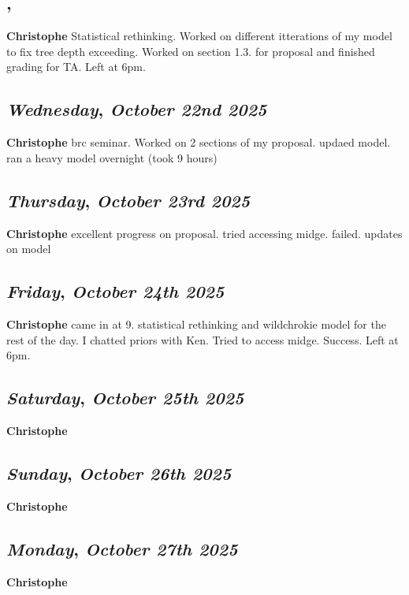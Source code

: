\subsection*{\weekday, \day}
\textbf {Christophe}
Statistical rethinking. Worked on different itterations of my model to fix tree depth exceeding. Worked on section 1.3. for proposal and finished grading for TA. Left at 6pm.

\def\day{\textit{October 22nd 2025}}
\def\weekday{\textit{Wednesday}}
\subsection*{\weekday, \day}
\textbf {Christophe}
brc seminar. Worked on 2 sections of my proposal. updaed model. ran a heavy model overnight (took 9 hours)

\def\day{\textit{October 23rd 2025}}
\def\weekday{\textit{Thursday}}
\subsection*{\weekday, \day}
\textbf {Christophe}
excellent progress on proposal. tried accessing midge. failed. updates on model

\def\day{\textit{October 24th 2025}}
\def\weekday{\textit{Friday}}
\subsection*{\weekday, \day}
\textbf {Christophe}
came in at 9. statistical rethinking and wildchrokie model for the rest of the day. I chatted priors with Ken. Tried to access midge. Success. Left at 6pm. 
\def\day{\textit{October 25th 2025}}
\def\weekday{\textit{Saturday}}
\subsection*{\weekday, \day}
\textbf {Christophe}

\def\day{\textit{October 26th 2025}}
\def\weekday{\textit{Sunday}}
\subsection*{\weekday, \day}
\textbf {Christophe}

\def\day{\textit{October 27th 2025}}
\def\weekday{\textit{Monday}}
\subsection*{\weekday, \day}
\textbf {Christophe}

